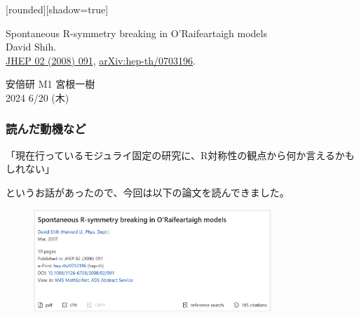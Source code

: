 \documentclass[
  unicode,a4paper,9pt,
  xcolor = {dvipsnames,svgnames},
  hyperref ={colorlinks=true,citecolor=Navy,linkcolor=NavyBlue,urlcolor=purple},
  ja=standard,lualatex
]{beamer}
\begin{document}
\begin{frame}

  [rounded][shadow=true]
  \begin{block}{}
    \vspace*{5pt}

    \centering\Large
    Spontaneous R-symmetry breaking in O'Raifeartaigh models
    \\
    \normalsize
    David Shih.
    \\
    \small
    \href{https://doi.org/10.1088/1126-6708/2008/02/091}{JHEP 02 (2008) 091},
    \href{https://arxiv.org/abs/hep-th/0703196}{arXiv:hep-th/0703196}.

    \vspace*{5pt}
  \end{block}

  \vspace*{1cm}

  \begin{center}
    安倍研 M1 宮根一樹\\
    2024 6/20 (木)
  \end{center}

\end{frame}

\nocite{Shih:2007av}

\begin{frame}
  \frametitle{読んだ動機など}

  \begin{center}
    「現在行っているモジュライ固定の研究に、R対称性の観点から何か言えるかもしれない」
  \end{center}
  というお話があったので、今回は以下の論文を読んできました。

  \begin{figure}
    \centering
    \includegraphics[width=0.8\textwidth]{fig/Shih2007av.PNG}
  \end{figure}

\end{frame}
\end{document}

